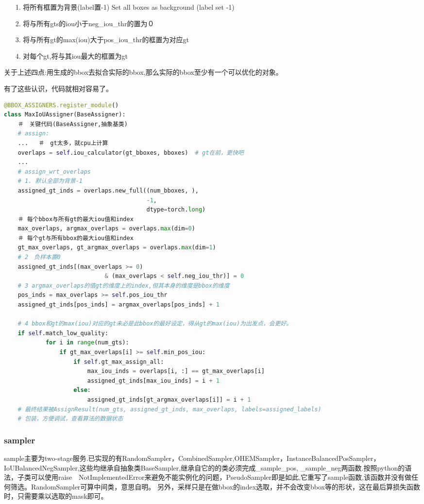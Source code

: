 \documentclass[UTF8]{ctexart}
\begin{document}
\begin{itemize}
    \item[1.] 将所有框置为背景(label置-1)  Set all boxes as background (label set -1)
    \item[2.] 将与所有gts的iou小于neg\_iou\_thr的置为０
    \item[3.] 将与所有gt的max(iou)大于pos\_iou\_thr的框置为对应gt
    \item[4.] 对每个gt,将与其iou最大的框置为gt
\end{itemize}
关于上述四点:用生成的bbox去拟合实际的bbox,那么实际的bbox至少有一个可以优化的对象。

有了这些认识，代码就相对容易了。
\lstset{style=mystyle}
\begin{lstlisting}[language=Python]
@BBOX_ASSIGNERS.register_module()
class MaxIoUAssigner(BaseAssigner):
    ＃　关键代码(BaseAssigner,抽象基类)
    # assign:
    ...   ＃　gt太多，就cpu上计算
    overlaps = self.iou_calculator(gt_bboxes, bboxes)  # gt在前，更快吧
    ...
    # assign_wrt_overlaps
    # 1. 默认全部为背景-1
    assigned_gt_inds = overlaps.new_full((num_bboxes, ),
                                         -1,
                                         dtype=torch.long)
    ＃ 每个bbox与所有gt的最大iou值和index
    max_overlaps, argmax_overlaps = overlaps.max(dim=0)
    ＃ 每个gt与所有bbox的最大iou值和index　
    gt_max_overlaps, gt_argmax_overlaps = overlaps.max(dim=1)
    # 2　负样本置0
    assigned_gt_inds[(max_overlaps >= 0)
                             & (max_overlaps < self.neg_iou_thr)] = 0
    # 3 argmax_overlaps的值gt的维度上的index,但其本身的维度是bbox的维度
    pos_inds = max_overlaps >= self.pos_iou_thr
    assigned_gt_inds[pos_inds] = argmax_overlaps[pos_inds] + 1
    
    # 4 bbox和gt的max(iou)对应的gt未必是此bbox的最好设定，得从gt的max(iou)为出发点，会更好。
    if self.match_low_quality:
            for i in range(num_gts):
                if gt_max_overlaps[i] >= self.min_pos_iou:
                    if self.gt_max_assign_all:
                        max_iou_inds = overlaps[i, :] == gt_max_overlaps[i]
                        assigned_gt_inds[max_iou_inds] = i + 1
                    else:
                        assigned_gt_inds[gt_argmax_overlaps[i]] = i + 1
    # 最终结果被AssignResult(num_gts, assigned_gt_inds, max_overlaps, labels=assigned_labels)
    # 包装，方便调试，查看算法的数据状态
\end{lstlisting}

\subsubsection{sampler}
sample主要为two-stage服务.已实现的有RandomSampler，CombinedSampler,OHEMSampler，InstanceBalancedPosSampler，IoUBalancedNegSampler,这些均继承自抽象类BaseSampler,继承自它的的类必须完成\_sample\_pos,
\_sample\_neg两函数.按照python的语法，子类可以使用raise　NotImplementedError来避免不能实例化的问题，PseudoSampler即是如此,它重写了sample函数,该函数并没有做任何筛选。RandomSampler可算中间类，意思自明。
另外，采样只是在做bbox的index选取，并不会改变bbox等的形状，这在最后算损失函数时，只需要乘以选取的mask即可。
\end{document}

